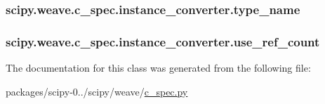 \subsubsection[{type\+\_\+name}]{\setlength{\rightskip}{0pt plus 5cm}scipy.\+weave.\+c\+\_\+spec.\+instance\+\_\+converter.\+type\+\_\+name}\label{classscipy_1_1weave_1_1c__spec_1_1instance__converter_aedd9c3d4276452ea06d4b794c521eb69}
\hypertarget{classscipy_1_1weave_1_1c__spec_1_1instance__converter_a779a6910f9f0f62be6da6e555a1a03c3}{}
\subsubsection[{use\+\_\+ref\+\_\+count}]{\setlength{\rightskip}{0pt plus 5cm}scipy.\+weave.\+c\+\_\+spec.\+instance\+\_\+converter.\+use\+\_\+ref\+\_\+count}\label{classscipy_1_1weave_1_1c__spec_1_1instance__converter_a779a6910f9f0f62be6da6e555a1a03c3}


The documentation for this class was generated from the following file\+:\begin{DoxyCompactItemize}
\item 
packages/scipy-\/0../scipy/weave/\hyperlink{c__spec_8py}{c\+\_\+spec.\+py}\end{DoxyCompactItemize}
